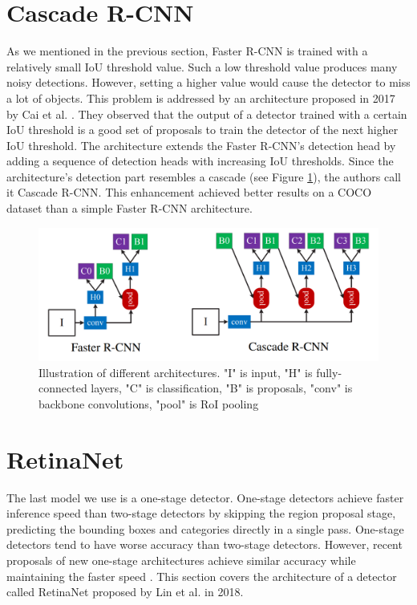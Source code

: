 \section{Cascade R-CNN}
As we mentioned in the previous section, Faster R-CNN is trained with a relatively small IoU threshold value. Such a low threshold value produces many noisy detections. However, setting a higher value would cause the detector to miss a lot of objects. This problem is addressed by an architecture proposed in 2017 by Cai et al. \cite{cascadercnn}. They observed that the output of a detector trained with a certain IoU threshold is a good set of proposals to train the detector of the next higher IoU threshold. The architecture extends the Faster R-CNN's detection head by adding a sequence of detection heads with increasing IoU thresholds. Since the architecture's detection part resembles a cascade (see Figure \ref{fig:cascade}), the authors call it Cascade R-CNN. This enhancement achieved better results on a COCO dataset \cite{coco} than a simple Faster R-CNN architecture.

\begin{figure}[h]
    \centering
    \includegraphics[width=0.7\linewidth]{Sources/Figures/cascade.png}
    \caption{Illustration of different architectures. "I" is input, "H" is fully-connected layers, "C" is classification, "B" is proposals, "conv" is backbone convolutions, "pool" is RoI pooling \cite{cascadercnn}}
    \label{fig:cascade}
\end{figure}

\section{RetinaNet}
The last model we use is a one-stage detector. One-stage detectors achieve faster inference speed than two-stage detectors by skipping the region proposal stage, predicting the bounding boxes and categories directly in a single pass. One-stage detectors tend to have worse accuracy than two-stage detectors.  However, recent proposals of new one-stage architectures achieve similar accuracy while maintaining the faster speed \cite{retinanet, yolo3}. This section covers the architecture of a detector called RetinaNet proposed by Lin et al. in 2018. 

